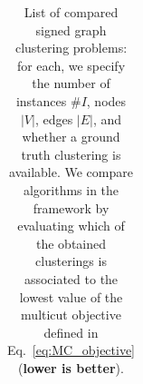 \begin{table}[t]
\begin{subtable}[t!]{\textwidth}
\begin{tabular}{l  c  r  c  c  c r r r r r r}


        \end{tabular}
    \end{subtable} 
    \caption{List of compared signed graph clustering problems: for each, we specify the number of instances $\# I$, nodes $|V|$, edges $|E|$, and whether a ground truth clustering is available. We compare algorithms in the \algname{} framework by evaluating which of the obtained clusterings is associated to the lowest value of the multicut objective defined in Eq.~\ref{eq:MC_objective} (\textbf{lower is better}).} 
    \label{tab:datasets_and_energies}
\end{table}
